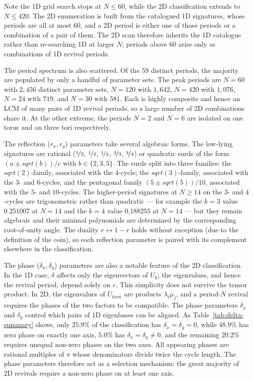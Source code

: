 \documentclass[aps,pra,reprint,amsmath,amssymb,superscriptaddress,floatfix]{revtex4-2}
\def\times{x}%
\def\rho{r}%
\def\sqrt#1{sqrt(#1)}%
\begin{document}
Note the 1D grid search stops at $N \le 60$, while the 2D
classification extends to $N \le 420$. 
The 2D enumeration is built from the catalogued 1D
signatures, whose periods are all at most $60$, and a 2D period is
either one of those periods or a combination of a pair of them.
The 2D scan therefore inherits the 1D catalogue rather than
re-searching 1D at larger $N$; periods above $60$ arise only as
combinations of 1D revival periods.
\par
The period spectrum is also scattered. Of the $59$ distinct
periods, the majority are populated by only a handful of
parameter sets. The peak periods are $N = 60$ with $2{,}456$
distinct parameter sets, $N = 120$ with $1{,}642$, $N = 420$ with
$1{,}076$, $N = 24$ with $719$, and $N = 30$ with $581$. Each is
highly composite and hence an LCM of many pairs of 1D revival
periods, so a large number of 2D combinations share it. At the
other extreme, the periods $N = 2$ and $N = 6$ are isolated on
one torus and on three tori respectively.
\par
The reflection ($\rho_x, \rho_y$) parameters take several algebraic forms. The
low-lying signatures are rational ($\nicefrac{1}{2}$,
$\nicefrac{1}{3}$, $\nicefrac{1}{4}$, $\nicefrac{2}{3}$,
$\nicefrac{3}{4}$) or quadratic surds of the form
$(a \pm \sqrt{b})/c$ with $b \in \{2, 3, 5\}$. The surds
split into three families: the $\sqrt{2}$-family, associated
with the $4$-cycle; the $\sqrt{3}$-family, associated with the
$3$- and $6$-cycles; and the pentagonal family
$(5 \pm \sqrt{5})/10$, associated with the $5$- and
$10$-cycles. The higher-period signatures at $N \ge 14$ on
the $3$- and $4$-cycles are trigonometric rather than
quadratic --- for example the $k=3$ value $0.251007$ at
$N=14$ and the $k=4$ value $0.188255$ at $N=14$ --- but they
remain algebraic and their minimal polynomials are determined
by the corresponding root-of-unity angle. The duality
$\rho \leftrightarrow 1 - \rho$ holds without exception
(due to the definition of the coin), so
each reflection parameter is paired with its complement
elsewhere in the classification.
\par
The phase ($\delta_x, \delta_y$) parameters are also
a notable feature of the 2D
classification. In the 1D case, $\delta$ affects only the
eigenvectors of $U_k$; the eigenvalues, and hence the revival
period, depend solely on $\rho$. This simplicity does not
survive the tensor product. In 2D, the eigenvalues of
$U_{k \times m}$ are products $\lambda_i \mu_j$, and a
period-$N$ revival requires the phases of the two factors to
be compatible. The phase parameters $\delta_x$ and $\delta_y$
control which pairs of 1D eigenbases can be aligned. As
Table~\ref{tab:delta-summary} shows, only $25.9\%$ of the
 classification has $\delta_x = \delta_y = 0$, while
$48.9\%$ has zero phase on exactly one axis, $5.0\%$ has
$\delta_x = \delta_y \neq 0$, and the remaining $20.2\%$
requires unequal non-zero phases on the two axes. All
appearing phases are rational multiples of $\pi$ whose
denominators divide twice the cycle length. The phase
parameters therefore act as a selection mechanism: the great
majority of 2D revivals require a non-zero phase on at least
one axis.
\par
\end{document}
